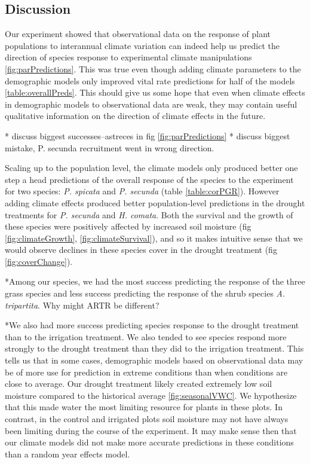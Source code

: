\documentclass[11pt]{article}
\begin{document}
\begin{doublespacing}
\section*{Discussion}

Our experiment showed that observational data on the response of plant populations to interannual climate variation can indeed help us predict the direction of species response to experimental climate manipulations \ref{fig:parPredictions}. This was true even though adding climate parameters to the demographic models only improved vital rate predictions for half of the models \ref{table:overallPreds}. This should give us some hope that even when climate effects in demographic models to observational data are weak, they may contain useful qualitative information on the direction of climate effects in the future. 

* discuss biggest successes--astreces in fig \ref{fig:parPredictions}
* discuss biggest mistake, P. secunda recruitment went in wrong direction. 
 
Scaling up to the population level, the climate models only produced better one step a head predictions of the overall response of the species to the experiment for two species: \textit{P. spicata} and \textit{P. secunda} (table \ref{table:corPGR}). However adding climate effects produced better population-level predictions in the drought treatments for \textit{P. secunda} and \textit{H. comata}.  Both the survival and the growth of these species were positively affected by increased soil moisture (fig \ref{fig:climateGrowth}, \ref{fig:climateSurvival}), and so it makes intuitive sense that we would observe declines in these species cover in the drought treatment (fig \ref{fig:coverChange}). 

*Among our species, we had the most success predicting the response of the three grass species and less success predicting the response of the shrub species \textit{A. tripartita}.    Why might ARTR be different? 

*We also had more success predicting species response to the drought treatment than to the irrigation treatment. We also tended to see species respond more strongly to the drought treatment than they did to the irrigation treatment.  This tells us that in some cases, demographic models based on observational data may be of more use for prediction in extreme conditions than when conditions are close to average.  Our drought treatment likely created extremely low soil moisture compared to the historical average \ref{fig:seasonalVWC}. We hypothesize that this made water the most limiting resource for plants in these plots. In contrast, in the control and irrigated plots soil moisture may not have always been limiting during the course of the experiment.  It may make sense then that our climate models did not make more accurate predictions in these conditions than a random year effects model.


\end{doublespacing}
\end{document}
